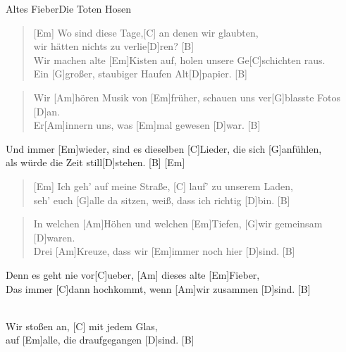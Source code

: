\begin{song}{Altes Fieber}{Die Toten Hosen}

    \begin{intro}
        [Em Em]
    \end{intro}

    \begin{verse}
        [Em] Wo sind diese Tage,[C] an denen wir glaubten, \\
        [G] wir hätten nichts zu verlie[D]ren? [B] \\
        Wir machen alte [Em]Kisten auf, holen unsere Ge[C]schichten raus. \\
        Ein [G]großer, staubiger Haufen Alt[D]papier. [B]
    \end{verse}

    \begin{verse}  %
        Wir [Am]hören Musik von [Em]früher, schauen uns ver[G]blasste Fotos [D]an. \\
        Er[Am]innern uns, was [Em]mal gewesen [D]war. [B]
    \end{verse}

    \begin{chorus}  %
        Und immer [Em]wieder, sind es dieselben [C]Lieder, die sich [G]anfühlen, \\
        als würde die Zeit still[D]stehen. [B] [Em]
    \end{chorus}

    \begin{verse}
        [Em] Ich geh' auf meine Straße, [C] lauf' zu unserem Laden, \\
        seh' euch [G]alle da sitzen, weiß, dass ich richtig [D]bin. [B]
    \end{verse}

    \begin{verse}  %
        In welchen [Am]Höhen und welchen [Em]Tiefen, [G]wir gemeinsam [D]waren. \\
        Drei [Am]Kreuze, dass wir [Em]immer noch hier [D]sind. [B]
    \end{verse}


    \begin{chorus} %
        Denn es geht nie vor[C]ueber, [Am] dieses alte [Em]Fieber, \\
        [D] Das immer [C]dann hochkommt, wenn [Am]wir zusammen [D]sind. [B]
    \end{chorus}

    \begin{bridge}
        [Am C Em D] \\
        [Am] Wir stoßen an, [C] mit jedem Glas, \\
        auf [Em]alle, die draufgegangen [D]sind. [B]
    \end{bridge}


\end{song}
